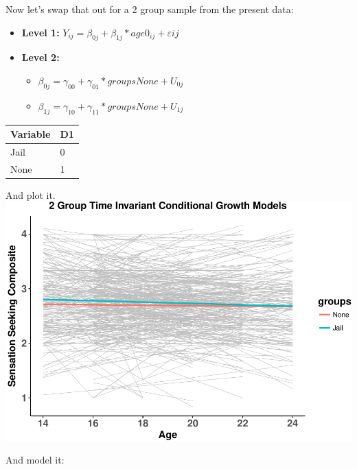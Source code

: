 \documentclass[]{article}
\newenvironment{Shaded}{\begin{snugshade}}{\end{snugshade}}
\newcommand{\KeywordTok}[1]{\textcolor[rgb]{0.13,0.29,0.53}{\textbf{{#1}}}}
\newcommand{\DataTypeTok}[1]{\textcolor[rgb]{0.13,0.29,0.53}{{#1}}}
\newcommand{\StringTok}[1]{\textcolor[rgb]{0.31,0.60,0.02}{{#1}}}
\newcommand{\NormalTok}[1]{{#1}}
\begin{document}
Now let's swap that out for a 2 group sample from the present data:

\begin{itemize}
  \item \textbf{Level 1:} $Y_{ij} = \beta_{0j} + \beta_{1j}*age0_{ij} + \varepsilon{ij}$
  \item \textbf{Level 2:} 
    \begin{itemize} 
      \item $\beta_{0j} = \gamma_{00} + \gamma_{01}*groupsNone + U_{0j}$
      \item $\beta_{1j} = \gamma_{10} + \gamma_{11}*groupsNone + U_{1j}$
    \end{itemize}
\end{itemize}

\begin{longtable}[]{@{}ll@{}}
\toprule
Variable & D1\tabularnewline
\midrule
\endhead
Jail & 0\tabularnewline
None & 1\tabularnewline
\bottomrule
\end{longtable}

And plot it.\\
\includegraphics{Conditional_Models_doc_files/figure-latex/unnamed-chunk-9-1.pdf}

And model it:\\
\small

\begin{Shaded}
\end{Shaded}
\end{document}
